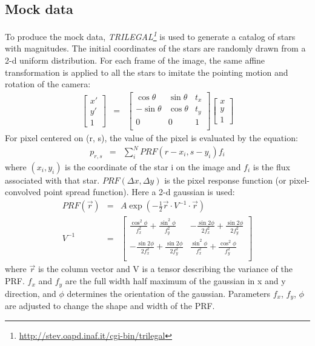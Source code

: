 \documentclass[12pt, preprint]{aastex}
\newcommand{\project}[1]{\textsl{#1}}
\begin{document}
\subsection{Mock data}
To produce the mock data, \project{TRILEGAL\footnote{\url{http://stev.oapd.inaf.it/cgi-bin/trilegal}}} \citep{TRILEGAL}  is used to generate a catalog of stars with magnitudes. 
The initial coordinates of the stars are randomly drawn from a 2-d uniform distribution. 
For each frame of the image, the same affine transformation is applied  to all the stars to imitate the pointing motion and rotation of the camera:
\begin{eqnarray}\label{transformation}
\begin{bmatrix}
    x' \\
    y' \\
    1
\end{bmatrix}
&=&
\begin{bmatrix}
    \cos \theta & \sin \theta & t_x \\
    -\sin \theta & \cos \theta & t_y \\
    0 & 0 & 1 \\
\end{bmatrix}
\begin{bmatrix}
    x \\
    y \\
    1
\end{bmatrix}
\end{eqnarray}
For pixel centered on (r, s), the value of the pixel is evaluated by the equation:
\begin{eqnarray}
p_{r,s} &=& \sum_{i}^{N} PRF(r-x_i, s-y_i) f_i
\end{eqnarray}
where $(x_i,y_i)$ is the coordinate of the star i on the image and $f_i$ is the flux associated with that star. 
$PRF(\Delta x, \Delta y)$ is the pixel response function (or pixel-convolved point spread function). 
Here a 2-d gaussian is used:
\begin{eqnarray} \label{prf}
PRF(\vec{r}) &=& A \exp(-\frac{1}{2} \vec{r}\cdot V^{-1}\cdot \vec{r}) \\
V^{-1} &=& 
\begin{bmatrix}
    \frac {\cos ^{2}\phi }{f_{x}^{2}}+\frac {\sin ^{2}\phi }{f_{y}^{2}} & -\frac {\sin 2\phi }{2f_{x}^{2}}+\frac {\sin 2\phi }{2f_{y}^{2}}  \\
    -\frac {\sin 2\phi }{2f_{x}^{2}}+\frac {\sin 2\phi }{2f_{y}^{2}} & \frac {\sin ^{2}\phi }{f_{x}^{2}}+\frac {\cos ^{2}\phi }{f_{y}^{2}} \\
\end{bmatrix}
\end{eqnarray}
where $\vec{r}$ is the column vector and V is a tensor describing the variance of the PRF.
$f_x$ and $f_y$ are the full width half maximum of the gaussian in x and y direction, and $\phi$ determines the orientation of the gaussian.
Parameters $f_x$, $f_y$, $\phi$ are adjusted to change the shape and width of the PRF.
\end{document}
